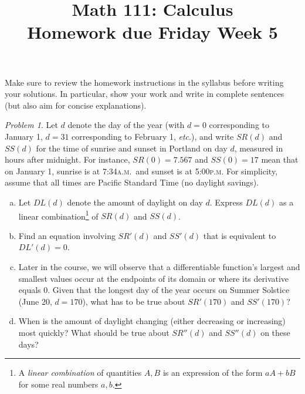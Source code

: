 \documentclass[11pt,twoside]{amsart}
\title{Math 111: Calculus\\ Homework due Friday Week 5}
\theoremstyle{plain}
\theoremstyle{remark}
\newtheorem{prob}{Problem}
\theoremstyle{definition}
\theoremstyle{definition}
\begin{document}
\maketitle

\noindent Make sure to review the homework instructions in the syllabus before writing your solutions. In particular, show your work and write in complete sentences (but also aim for concise explanations).

\begin{prob}
Let $d$ denote the day of the year (with $d=0$ corresponding to January 1, $d=31$ corresponding to February 1, \emph{etc}.), and write $SR(d)$ and $SS(d)$ for the time of sunrise and sunset in Portland on day $d$, measured in hours after midnight. For instance, $SR(0) = 7.567$ and $SS(0) = 17$ mean that on January 1, sunrise is at 7:34\textsc{a.m.}~and sunset is at 5:00\textsc{p.m.} For simplicity, assume that all times are Pacific Standard Time (no daylight savings).
\begin{enumerate}[(a)]
\item Let $DL(d)$ denote the amount of daylight on day $d$. Express $DL(d)$ as a linear combination\footnote{A \emph{linear combination} of quantities $A,B$ is an expression of the form $aA+bB$ for some real numbers $a,b$.} of $SR(d)$ and $SS(d)$.
\item Find an equation involving $SR'(d)$ and $SS'(d)$ that is equivalent to $DL'(d)=0$.
\item Later in the course, we will observe that a differentiable function's largest and smallest values occur  at the endpoints of its domain or where its derivative equals 0. Given that the longest day of the year occurs on Summer Solstice (June 20, $d = 170$), what has to be true about $SR'(170)$ and $SS'(170)$?
\item When is the amount of daylight changing (either decreasing or increasing) most quickly? What should be true about $SR''(d)$ and $SS''(d)$ on these days?
\end{enumerate}
\end{prob}
\end{document}
